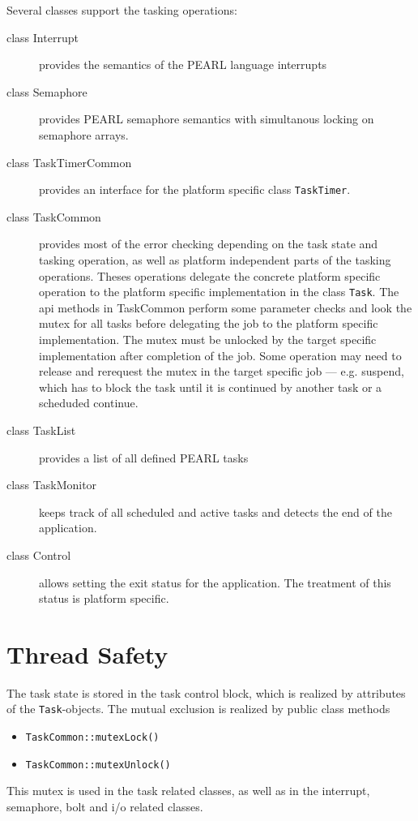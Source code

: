 Several classes support the tasking operations:
\begin{description}
\item[class Interrupt] provides the semantics of the PEARL language interrupts
\item[class Semaphore] provides PEARL semaphore semantics with simultanous
   locking on semaphore arrays.
\item[class TaskTimerCommon] provides an interface for the platform
   specific class \verb|TaskTimer|. 
\item[class TaskCommon] provides most of the error checking depending on
   the task state and tasking operation, as well as platform independent
   parts of the tasking operations. Theses operations delegate the concrete
   platform specific operation to the platform specific implementation
   in the class \verb|Task|. The api methods in TaskCommon perform some
    parameter checks and look the mutex for all tasks before delegating 
    the job to the platform specific implementation. 
    The mutex must be unlocked by the target specific implementation 
    after completion of the job. Some operation may need to release and 
    rerequest the mutex in the target specific job --- e.g. suspend,
    which has to block the task until it is continued by another task
    or a scheduded continue.

\item[class TaskList] provides a list of all defined PEARL tasks
\item[class TaskMonitor] keeps track of all scheduled and active tasks and
   detects the end of the application.
\item[class Control] allows setting the exit status for the application. 
  The treatment of this status is platform specific.
\end{description}

\section{Thread Safety}
The task state is stored in the task control block, which is realized
by attributes of the \verb|Task|-objects.
The mutual exclusion is realized by  public class methods
\begin{itemize}
\item \verb|TaskCommon::mutexLock()|
\item \verb|TaskCommon::mutexUnlock()|
\end{itemize}
 
This mutex is used in the task related classes, as well as in the interrupt,
semaphore, bolt and i/o related classes. 

